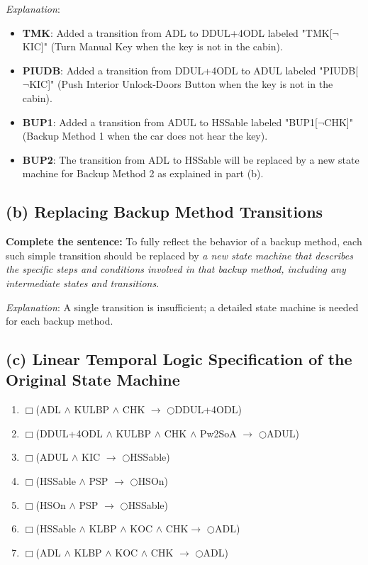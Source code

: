 \documentclass{article}
\begin{document}
\textit{Explanation}:
\begin{itemize}
    \item \textbf{TMK}: Added a transition from ADL to DDUL+4ODL labeled "TMK[$\neg$KIC]" (Turn Manual Key when the key is not in the cabin).
    \item \textbf{PIUDB}: Added a transition from DDUL+4ODL to ADUL labeled "PIUDB[$\neg$KIC]" (Push Interior Unlock-Doors Button when the key is not in the cabin).
    \item \textbf{BUP1}: Added a transition from ADUL to HSSable labeled "BUP1[$\neg$CHK]" (Backup Method 1 when the car does not hear the key).
    \item \textbf{BUP2}: The transition from ADL to HSSable will be replaced by a new state machine for Backup Method 2 as explained in part (b).
\end{itemize}

\subsection*{(b) Replacing Backup Method Transitions}

\textbf{Complete the sentence:} To fully reflect the behavior of a backup method, each such simple transition should be replaced by \textit{a new state machine that describes the specific steps and conditions involved in that backup method, including any intermediate states and transitions}.

\textit{Explanation}: A single transition is insufficient; a detailed state machine is needed for each backup method.

\subsection*{(c) Linear Temporal Logic Specification of the Original State Machine}

\begin{enumerate}
    \item $\Box$(ADL $\wedge$ KULBP $\wedge$ CHK $\rightarrow$ $\bigcirc$DDUL+4ODL)
    \item $\Box$(DDUL+4ODL $\wedge$ KULBP $\wedge$ CHK $\wedge$ Pw2SoA $\rightarrow$ $\bigcirc$ADUL)
    \item $\Box$(ADUL $\wedge$ KIC $\rightarrow$ $\bigcirc$HSSable)
    \item $\Box$(HSSable $\wedge$ PSP $\rightarrow$ $\bigcirc$HSOn)
    \item $\Box$(HSOn $\wedge$ PSP $\rightarrow$ $\bigcirc$HSSable)
    \item $\Box$(HSSable $\wedge$ KLBP $\wedge$ KOC $\wedge$ CHK$\rightarrow$ $\bigcirc$ADL)
    \item $\Box$(ADL $\wedge$ KLBP $\wedge$ KOC $\wedge$ CHK $\rightarrow$ $\bigcirc$ADL)
\end{enumerate}
\end{document}
